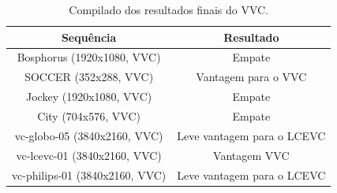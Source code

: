 \begin{table}[h]
    \centering
    \begin{tabular}{|c|c|}
        \hline
        \textbf{Sequência} & \textbf{Resultado}\\
        \hline
        Bosphorus (1920x1080, VVC) & Empate\\
        \hline
        SOCCER (352x288, VVC) & Vantagem para o VVC\\
        \hline
        Jockey (1920x1080, VVC) & Empate\\
        \hline
        City (704x576, VVC) & Empate\\
        \hline
        vc-globo-05 (3840x2160, VVC) & Leve vantagem para o LCEVC\\
        \hline
        vc-lcevc-01 (3840x2160, VVC) & Vantagem VVC\\
        \hline
        vc-philips-01 (3840x2160, VVC) & Leve vantagem para o LCEVC\\
        \hline
    \end{tabular}
    \caption{Compilado dos resultados finais do VVC.}
    \label{tab:results-vvc}
\end{table}